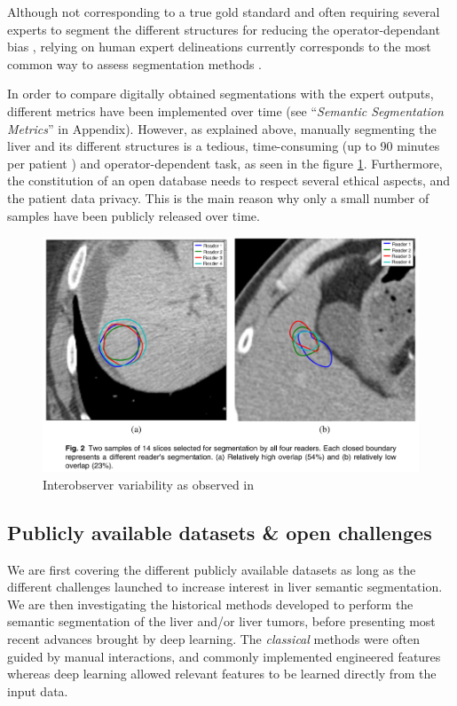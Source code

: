 \documentclass[]{article}
\begin{document}
	Although not corresponding to a true gold standard \cite{Heimann2009} and often requiring several experts to segment the
	different structures for reducing the operator-dependant bias \cite{Echegaray2015, Moltz2009}, relying on human expert
	delineations currently corresponds to the most common way to assess
	segmentation methods \cite{Bilic2019}.
	
	In order to compare digitally obtained segmentations with the expert
	outputs, different metrics have been implemented over time (see
	``\emph{Semantic Segmentation Metrics}'' in Appendix). However, as
	explained above, manually segmenting the liver and its different
	structures is a tedious, time-consuming (up to 90 minutes per patient
	\cite{Gotra2017}) and operator-dependent task, as seen in the figure \ref{interobserver_var}.
	Furthermore, the constitution of an open database needs to respect
	several ethical aspects, and the patient data privacy. This is the main
	reason why only a small number of samples have been publicly released
	over time.
	
	\begin{figure}[!h]
		\centering        
		\includegraphics[width=0.7\linewidth]{./images/image37.png}
		\caption{Interobserver variability as observed in \cite{Echegaray2015}}
		\label{interobserver_var}
	\end{figure} 
	
	\subsection*{Publicly available datasets \& open challenges}
	
	We are first covering the different publicly available datasets as long
	as the different challenges launched to increase interest in liver
	semantic segmentation. We are then investigating the historical methods
	developed to perform the semantic segmentation of the liver and/or liver
	tumors, before presenting most recent advances brought by deep learning.
	The \emph{classical }methods were often guided by manual interactions,
	and commonly implemented engineered features whereas deep learning
	allowed relevant features to be learned directly from the input data.
	
\end{document}
